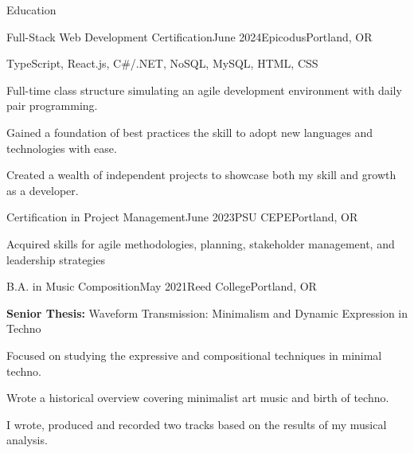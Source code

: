 \documentclass[
	11pt, %
]{resume} %
\begin{document}
\begin{rSection}{Education}

	\begin{rSubsection}{Full-Stack Web Development Certification}{June 2024}{Epicodus}{Portland, OR}
		\item TypeScript, React.js, C\#/.NET, NoSQL, MySQL, HTML, CSS
		\item Full-time class structure simulating an agile development environment with daily pair programming.
		\item Gained a foundation of best practices the skill to adopt new languages and technologies with ease.
		\item Created a wealth of independent projects to showcase both my skill and growth as a developer.
	\end{rSubsection}
	\begin{rSubsection}{Certification in Project Management}{June 2023}{PSU CEPE}{Portland, OR}
		\item Acquired skills for agile methodologies, planning, stakeholder management, and leadership strategies
	\end{rSubsection}
	\begin{rSubsection}{B.A. in Music Composition}{May 2021}{Reed College}{Portland, OR}
		\item \textbf{Senior Thesis:} Waveform Transmission: Minimalism and Dynamic Expression in Techno
		\item Focused on studying the expressive and compositional techniques in minimal techno.
		\item Wrote a historical overview covering minimalist art music and birth of techno.
		\item I wrote, produced and recorded two tracks based on the results of my musical analysis.
	\end{rSubsection}


\end{rSection}
\end{document}

